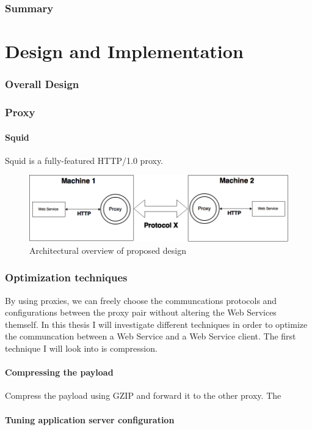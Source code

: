 \documentclass[USenglish]{article}
\begin{document}
\section{Summary}



\part{Design and Implementation}
\section{Overall Design}
\section{Proxy}
\subsection{Squid}
Squid is a fully-featured HTTP/1.0 proxy.
\begin{figure}[h]
\includegraphics[scale=0.4]{images/architecture.png}
\caption{Architectural overview of proposed design}
\end{figure}

\section{Optimization techniques}
By using proxies, we can freely choose the communcations protocols and
configurations between the proxy pair without altering the Web Services themself.
In this thesis I will investigate different techniques in order to optimize the
communcation between a Web Service and a Web Service client. The first technique
I will look into is compression.

\subsection{Compressing the payload}
Compress the payload using GZIP and forward it to the other proxy. The

\subsection{Tuning application server configuration}
\end{document}
